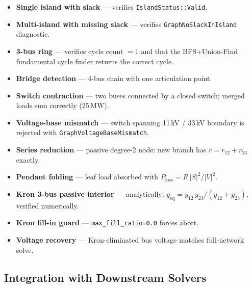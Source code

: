 \begin{itemize}
  \item \textbf{Single island with slack} — verifies \texttt{IslandStatus::Valid}.
  \item \textbf{Multi-island with missing slack} — verifies
        \texttt{GraphNoSlackInIsland} diagnostic.
  \item \textbf{3-bus ring} — verifies cycle count $= 1$ and that the
        BFS+Union-Find fundamental cycle finder returns the correct cycle.
  \item \textbf{Bridge detection} — 4-bus chain with one articulation point.
  \item \textbf{Switch contraction} — two buses connected by a closed switch;
        merged loads sum correctly ($25\,\text{MW}$).
  \item \textbf{Voltage-base mismatch} — switch spanning 11\,kV / 33\,kV
        boundary is rejected with \texttt{GraphVoltageBaseMismatch}.
  \item \textbf{Series reduction} — passive degree-2 node: new branch has
        $r = r_{12} + r_{23}$ exactly.
  \item \textbf{Pendant folding} — leaf load absorbed with
        $P_{\text{loss}} = R\,|S|^2/|V|^2$.
  \item \textbf{Kron 3-bus passive interior} — analytically: $y_{\text{eq}} =
        y_{12}\,y_{23}/(y_{12}+y_{23})$, verified numerically.
  \item \textbf{Kron fill-in guard} — \texttt{max\_fill\_ratio=0.0} forces
        abort.
  \item \textbf{Voltage recovery} — Kron-eliminated bus voltage matches
        full-network solve.
\end{itemize}

\subsection{Integration with Downstream Solvers}
\label{sec:graph-integration}

